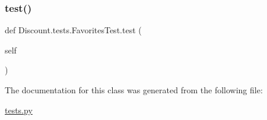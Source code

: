 \subsubsection{\texorpdfstring{test()}{test()}}
{\footnotesize\ttfamily def Discount.\+tests.\+Favorites\+Test.\+test (\begin{DoxyParamCaption}\item[{}]{self }\end{DoxyParamCaption})}



The documentation for this class was generated from the following file\+:\begin{DoxyCompactItemize}
\item 
\hyperlink{tests_8py}{tests.\+py}\end{DoxyCompactItemize}
